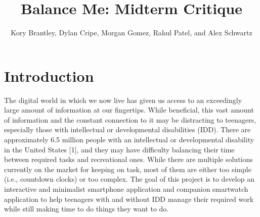 \documentclass{sigchi}
\def\plaintitle{Balance Me: Midterm Critique}
\def\plainauthor{Kory Brantley, Dylan Cripe, Morgan Gomez, Rahul Patel,
and Alex Schwartz}
\begin{document}
\title{\plaintitle}

\author{
\plainauthor
}

\maketitle

\section{Introduction}

The digital world in which we now live has given us access to an exceedingly
large amount of information at our fingertips. While beneficial, this vast
amount of information and the constant connection to it may be distracting to
teenagers, especially those with intellectual or developmental disabilities
(IDD). There are approximately 6.5 million people with an intellectual or
developmental disability in the United States [1], and they may have difficulty
balancing their time between required tasks and recreational ones. While there
are multiple solutions currently on the market for keeping on task, most of
them are either too simple (i.e., countdown clocks) or too complex. The goal of
this project is to develop an interactive and minimalist smartphone application
and companion smartwatch application to help teenagers with and without IDD
manage their required work while still making time to do things they want to do.
\end{document}
